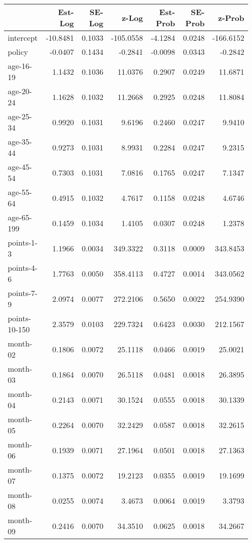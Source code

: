 \documentclass[10pt]{article}
\begin{document}
\begin{table}[ht]
\centering
\begin{tabular}{lrrrrrr}
  \hline
 & Est-Log & SE-Log & z-Log & Est-Prob & SE-Prob & z-Prob \\ 
  \hline
intercept & -10.8481 & 0.1033 & -105.0558 & -4.1284 & 0.0248 & -166.6152 \\ 
  policy & -0.0407 & 0.1434 & -0.2841 & -0.0098 & 0.0343 & -0.2842 \\ 
  age-16-19 & 1.1432 & 0.1036 & 11.0376 & 0.2907 & 0.0249 & 11.6871 \\ 
  age-20-24 & 1.1628 & 0.1032 & 11.2668 & 0.2925 & 0.0248 & 11.8084 \\ 
  age-25-34 & 0.9920 & 0.1031 & 9.6196 & 0.2460 & 0.0247 & 9.9410 \\ 
  age-35-44 & 0.9273 & 0.1031 & 8.9931 & 0.2284 & 0.0247 & 9.2315 \\ 
  age-45-54 & 0.7303 & 0.1031 & 7.0816 & 0.1765 & 0.0247 & 7.1347 \\ 
  age-55-64 & 0.4915 & 0.1032 & 4.7617 & 0.1158 & 0.0248 & 4.6746 \\ 
  age-65-199 & 0.1459 & 0.1034 & 1.4105 & 0.0307 & 0.0248 & 1.2378 \\ 
  points-1-3 & 1.1966 & 0.0034 & 349.3322 & 0.3118 & 0.0009 & 343.8453 \\ 
  points-4-6 & 1.7763 & 0.0050 & 358.4113 & 0.4727 & 0.0014 & 343.0562 \\ 
  points-7-9 & 2.0974 & 0.0077 & 272.2106 & 0.5650 & 0.0022 & 254.9390 \\ 
  points-10-150 & 2.3579 & 0.0103 & 229.7324 & 0.6423 & 0.0030 & 212.1567 \\ 
  month-02 & 0.1806 & 0.0072 & 25.1118 & 0.0466 & 0.0019 & 25.0021 \\ 
  month-03 & 0.1864 & 0.0070 & 26.5118 & 0.0481 & 0.0018 & 26.3895 \\ 
  month-04 & 0.2143 & 0.0071 & 30.1524 & 0.0555 & 0.0018 & 30.1339 \\ 
  month-05 & 0.2264 & 0.0070 & 32.2429 & 0.0587 & 0.0018 & 32.2615 \\ 
  month-06 & 0.1939 & 0.0071 & 27.1964 & 0.0501 & 0.0018 & 27.1363 \\ 
  month-07 & 0.1375 & 0.0072 & 19.2123 & 0.0355 & 0.0019 & 19.1699 \\ 
  month-08 & 0.0255 & 0.0074 & 3.4673 & 0.0064 & 0.0019 & 3.3793 \\ 
  month-09 & 0.2416 & 0.0070 & 34.3510 & 0.0625 & 0.0018 & 34.2667 \\ 

\end{tabular}
\end{table}
\end{document}
